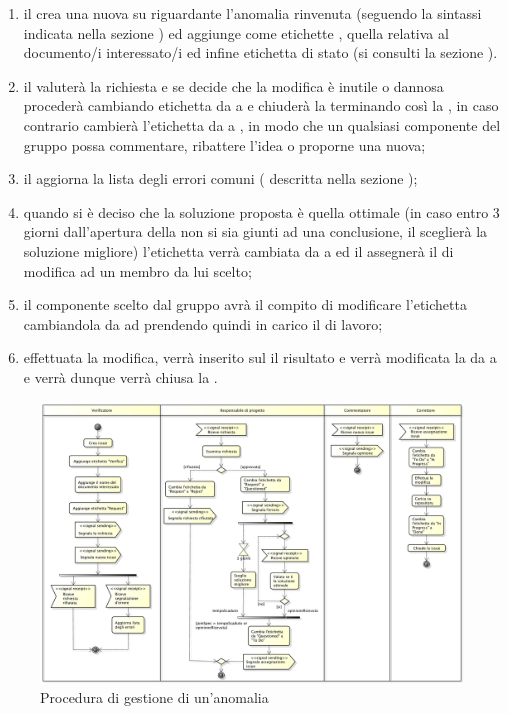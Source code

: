 				\begin{enumerate}
				    \item il  crea una nuova  su  riguardante l'anomalia rinvenuta (seguendo la sintassi indicata nella sezione ) ed aggiunge come etichette , quella relativa al documento/i interessato/i ed infine etichetta di stato  (si consulti la sezione ).
				    \item il  valuterà la richiesta e se decide che la modifica è inutile o dannosa procederà cambiando etichetta da  a  e chiuderà la  terminando così la , in caso contrario cambierà l'etichetta da  a , in modo che un qualsiasi componente del gruppo possa commentare, ribattere l'idea o proporne una nuova;
				    \item il  aggiorna la lista degli errori comuni ( descritta nella sezione );
				    \item quando si è deciso che la soluzione proposta è quella ottimale (in caso entro 3 giorni dall'apertura della  non si sia giunti ad una conclusione, il  sceglierà la soluzione migliore) l'etichetta verrà cambiata da  a  ed il  assegnerà il  di modifica ad un membro da lui scelto;
				    \item il componente scelto dal gruppo avrà il compito di modificare l'etichetta cambiandola da  ad  prendendo quindi in carico il  di lavoro;
				    \item effettuata la modifica, verrà inserito sul  il risultato e verrà modificata la  da  a  e verrà dunque verrà chiusa la .
			\end{enumerate}
			\begin{figure}[H]
					\centering
					\includegraphics[width=1.0\textwidth]{NormeDiProgetto/Pics/GestioneAnomalia}
					\caption{Procedura di gestione di un'anomalia}
				\end{figure}
